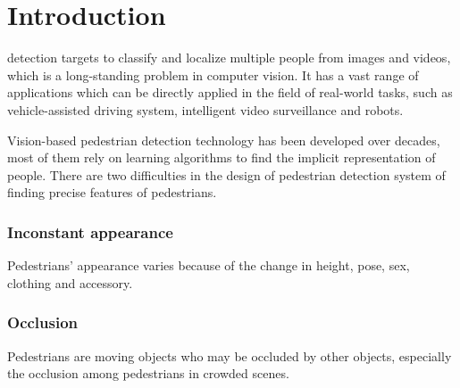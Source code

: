 \documentclass[journal]{IEEEtran}
\begin{document}
%
\IEEEpeerreviewmaketitle



\section{Introduction}
% 
% 
% 
% 
 detection targets to classify and localize multiple people from images and videos, which is a long-standing problem in computer vision. It has a vast range of applications which can be directly applied in the field of real-world tasks, such as vehicle-assisted driving system, intelligent
video surveillance and robots.

Vision-based pedestrian detection technology has been developed over decades, most of them rely on learning algorithms to find the implicit representation of people. There are two difficulties in the design of pedestrian detection system of finding precise features of pedestrians.

\subsubsection{Inconstant appearance}

Pedestrians’ appearance varies because of the change in height, pose, sex, clothing and accessory. 
\subsubsection{Occlusion}

Pedestrians are moving objects who may be occluded by other objects, especially the occlusion among pedestrians in crowded scenes.
\end{document}
